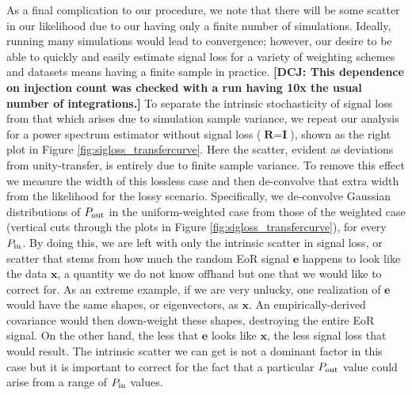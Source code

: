 \documentclass[preprint2,numberedappendix,tighten]{aastex6}  %
\newcommand{\dcj}[1]{{\color{orange} \textbf{[DCJ: #1]}}}
\begin{document}
As a final complication to our procedure, we note that there will be some scatter in our likelihood due to our having only a finite number of simulations. Ideally, running many simulations would lead to convergence; however, our desire to be able to quickly and easily estimate signal loss for a variety of weighting schemes and datasets means having a finite sample in practice. \dcj{This dependence on injection count was checked with a run having 10x the usual number of integrations.} To separate the intrinsic stochasticity of signal loss from that which arises due to simulation sample variance, we repeat our analysis for a power spectrum estimator without signal loss ($\textbf{R} = \textbf{I}$), shown as the right plot in Figure \ref{fig:sigloss_transfercurve}. Here the scatter, evident as deviations from unity-transfer, is entirely due to finite sample variance. To remove this effect we measure the width of this lossless case and then de-convolve that extra width from the likelihood for the lossy scenario. Specifically, we de-convolve Gaussian distributions of $P_{\rm out}$ in the uniform-weighted case from those of the weighted case (vertical cuts through the plots in Figure \ref{fig:sigloss_transfercurve}), for every $P_{\rm in}$. By doing this, we are left with only the intrinsic scatter in signal loss, or scatter that stems from how much the random EoR signal $\textbf{e}$ happens to 
look like the data $\textbf{x}$, a quantity we do not know offhand but one that we would like to correct for. As an extreme example, if we are very unlucky, one realization of $\textbf{e}$ would have the same shapes, or eigenvectors, as $\textbf{x}$. An empirically-derived covariance would then down-weight these shapes, destroying the entire EoR signal. On the other hand, the less that $\textbf{e}$ looks like $\textbf{x}$, the less signal loss that would result. The intrinsic scatter we can get is not a dominant factor in this case but it is important to correct for the fact that a particular $P_{\rm out}$ value could arise from a range of $P_{\rm in}$ values. 

\end{document}
